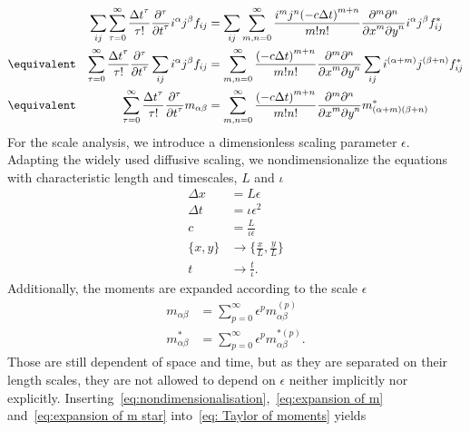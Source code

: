 \begin{align}
    \nonumber
    & & \sum_{ij} \sum_{\tau = 0}^\infty \frac{{\Delta t}^\tau }{\tau!} \frac{\partial^\tau}{{\partial t}^\tau} i^\alpha j^\beta f_{ij} &=
    \sum_{ij}\sum_{m,n = 0}^\infty \frac{i^m j^n {(-c\Delta t)}^{m+n}} {m!n!} \frac{\partial^m \partial^n}{ {\partial x}^m{\partial y}^n}i^\alpha j^\beta f^*_{ij}\\
    \nonumber
    &\equivalent &
    \sum_{\tau = 0}^\infty \frac{{\Delta t}^\tau }{\tau!} \frac{\partial^\tau}{{\partial t}^\tau} \sum_{ij}i^\alpha j^\beta f_{ij} &=
    \sum_{m,n = 0}^\infty \frac{{(-c\Delta t)}^{m+n}} {m!n!} \frac{\partial^m \partial^n}{ {\partial x}^m{\partial y}^n}\sum_{ij}i^{(\alpha + m)} j^{(\beta+n)} f^*_{ij}\\
      \label{eq: Taylor of moments}
     &\equivalent &
     \sum_{\tau = 0}^\infty \frac{{\Delta t}^\tau }{\tau!} \frac{\partial^\tau}{{\partial t}^\tau} m_{\alpha\beta} &=
    \sum_{m,n = 0}^\infty \frac{{(-c\Delta t)}^{m+n}} {m!n!} \frac{\partial^m \partial^n}{ {\partial x}^m{\partial y}^n} m^*_{(\alpha + m)(\beta + n)}
\end{align}
For the scale analysis, we introduce a dimensionless scaling parameter $\epsilon$.
Adapting the widely used diffusive scaling, we nondimensionalize the equations with characteristic length and timescales, $L$ and $\iota$
\begin{equation}
  \label{eq:nondimensionalisation}
  \begin{aligned}
    \Delta x & = L\epsilon \\
    \Delta t & = \iota\epsilon^2 \\
    c & = \frac{L}{\iota\epsilon} \\
    \{x, y\} & \rightarrow \{\frac{x}{L}, \frac{y}{L}\} \\
    t & \rightarrow \frac{t}{\iota}.
  \end{aligned}
\end{equation}
Additionally, the moments are expanded according to the scale $\epsilon$
\begin{align}
    \label{eq:expansion of m}
    m_{\alpha\beta} & = \sum_{p=0}^{\infty} \epsilon^p m_{\alpha\beta}^{(p)} \\
    \label{eq:expansion of m star}
    m^*_{\alpha\beta} & = \sum_{p=0}^{\infty} \epsilon^p m_{\alpha\beta}^{*(p)}.
\end{align}
Those are still dependent of space and time, but as they are separated on their length scales, they are not allowed to depend on $\epsilon$ neither implicitly nor explicitly.
Inserting~\eqref{eq:nondimensionalisation},~\eqref{eq:expansion of m} and~\eqref{eq:expansion of m star} into~\eqref{eq: Taylor of moments} yields

